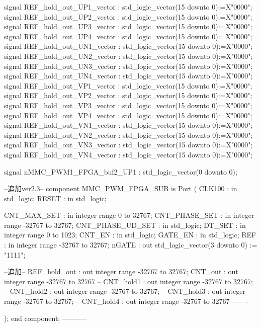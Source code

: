 \begin{mylisting}[language=VHDL,caption=ゲート信号出力モジュール,label=MMC_PWM_GEN_module_VHDL]
	signal 	REF_hold_out_UP1_vector					: std_logic_vector(15 downto 0):=X"0000";
	signal 	REF_hold_out_UP2_vector					: std_logic_vector(15 downto 0):=X"0000";
	signal 	REF_hold_out_UP3_vector					: std_logic_vector(15 downto 0):=X"0000";
	signal 	REF_hold_out_UP4_vector					: std_logic_vector(15 downto 0):=X"0000";
	signal 	REF_hold_out_UN1_vector					: std_logic_vector(15 downto 0):=X"0000";
	signal 	REF_hold_out_UN2_vector					: std_logic_vector(15 downto 0):=X"0000";
	signal 	REF_hold_out_UN3_vector					: std_logic_vector(15 downto 0):=X"0000";
	signal 	REF_hold_out_UN4_vector					: std_logic_vector(15 downto 0):=X"0000";
	signal 	REF_hold_out_VP1_vector					: std_logic_vector(15 downto 0):=X"0000";
	signal 	REF_hold_out_VP2_vector					: std_logic_vector(15 downto 0):=X"0000";
	signal 	REF_hold_out_VP3_vector					: std_logic_vector(15 downto 0):=X"0000";
	signal 	REF_hold_out_VP4_vector					: std_logic_vector(15 downto 0):=X"0000";
	signal 	REF_hold_out_VN1_vector					: std_logic_vector(15 downto 0):=X"0000";
	signal 	REF_hold_out_VN2_vector					: std_logic_vector(15 downto 0):=X"0000";
	signal 	REF_hold_out_VN3_vector					: std_logic_vector(15 downto 0):=X"0000";
	signal 	REF_hold_out_VN4_vector					: std_logic_vector(15 downto 0):=X"0000";
	
	signal   nMMC_PWM1_FPGA_buf2_UP1 : std_logic_vector(0 downto 0);
	
	--追加ver2.3--
		component MMC_PWM_FPGA_SUB is
		Port (
		CLK100				: in  std_logic;
		RESET					: in	std_logic;
		
		CNT_MAX_SET			: in	integer range 0 to 32767;
		CNT_PHASE_SET		: in	integer range -32767 to 32767;
		CNT_PHASE_UD_SET	: in	std_logic;
		DT_SET				: in	integer range 0 to 1023;
		CNT_EN				: in	std_logic;
		GATE_EN				: in	std_logic;
		REF					: in	integer range -32767 to 32767;
		nGATE					: out	std_logic_vector(3 downto 0)	:= "1111";
		
		--追加--
		REF_hold_out			: out integer range -32767 to 32767;
		CNT_out					: out integer range -32767 to 32767
--		CNT_hold1				: out integer range -32767 to 32767;
--		CNT_hold2				: out integer range -32767 to 32767;
--		CNT_hold3				: out integer range -32767 to 32767;
--		CNT_hold4				: out integer range -32767 to 32767
		-------

			);
		end component;
		-----------


\end{mylisting}
